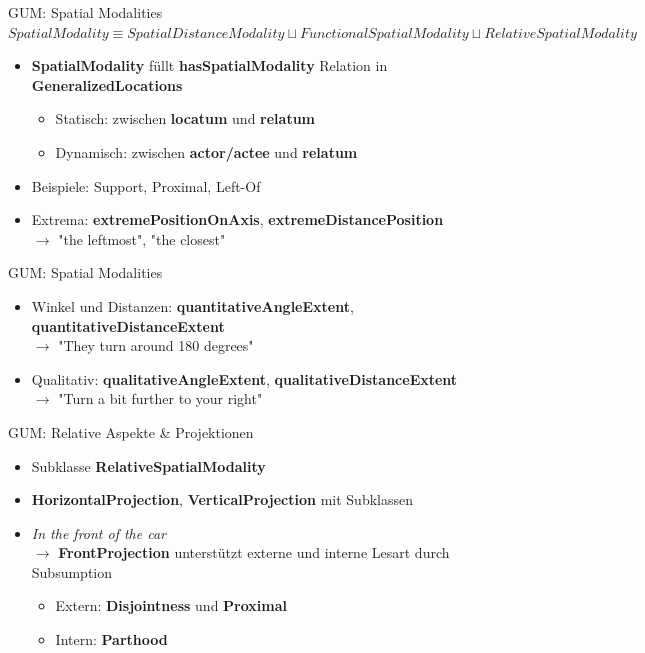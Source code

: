 \documentclass[12pt,a4paper]{beamer}
\begin{document}
\begin{frame}{GUM: Spatial Modalities}
$  SpatialModality \equiv SpatialDistanceModality \sqcup FunctionalSpatialModality \sqcup RelativeSpatialModality $
\begin{itemize}
\item \textbf{SpatialModality} füllt \textbf{hasSpatialModality} Relation in \textbf{GeneralizedLocations}
\begin{itemize}
    \item Statisch: zwischen \textbf{locatum} und \textbf{relatum}
    \item Dynamisch: zwischen \textbf{actor/actee} und \textbf{relatum}
\end{itemize}
\item Beispiele: Support, Proximal, Left-Of
\item Extrema: \textbf{extremePositionOnAxis}, \textbf{extremeDistancePosition} \\
$\to$ "the leftmost", "the closest"
\end{itemize}
\end{frame}

\begin{frame}{GUM: Spatial Modalities}
\begin{itemize}
\item Winkel und Distanzen: \textbf{quantitativeAngleExtent}, \textbf{quantitativeDistanceExtent} \\
$\to$ "They turn around 180 degrees"
\item Qualitativ: \textbf{qualitativeAngleExtent}, \textbf{qualitativeDistanceExtent} \\
$\to$ "Turn a bit further to your right"
\end{itemize}
\end{frame}


\begin{frame}{GUM: Relative Aspekte \& Projektionen}
\begin{itemize}
\item Subklasse \textbf{RelativeSpatialModality}
\item \textbf{HorizontalProjection}, \textbf{VerticalProjection} mit Subklassen \\
\item \textit{In the front of the car} \\
$\to$ \textbf{FrontProjection} unterstützt externe und interne Lesart durch Subsumption
\begin{itemize}
    \item Extern: \textbf{Disjointness} und \textbf{Proximal}
    \item Intern: \textbf{Parthood}
\end{itemize}
\end{itemize}
\end{frame}
\end{document}
